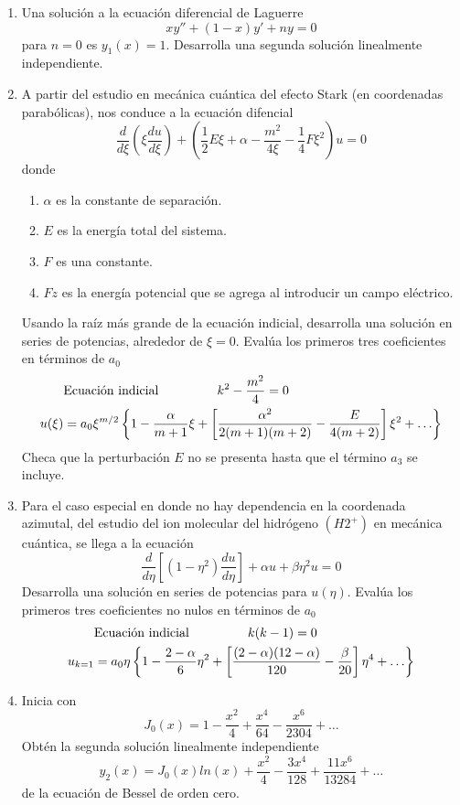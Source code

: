 \begin{enumerate}
\begin{enumerate}[label=(\alph*)]
\end{enumerate}
\item Una solución a la ecuación diferencial de Laguerre
\[ xy'' + (1-x) y' + ny = 0\]
para $n=0$ es $y_{1}(x)=1$. Desarrolla una segunda solución linealmente independiente.
\item A partir del estudio en mecánica cuántica del efecto Stark (en coordenadas parabólicas), nos conduce a la ecuación difencial
\[ \dfrac{d}{d \xi} \left( \xi \dfrac{d u}{d \xi} \right) + \left( \dfrac{1}{2} E \xi + \alpha - \dfrac{m^{2}}{4 \xi} - \dfrac{1}{4} F \xi^{2} \right) u = 0 \]
donde
\begin{enumerate}[label=(\roman*)]
\item $\alpha$ es la constante de separación.
\item $E$ es la energía total del sistema.
\item $F$ es una constante.
\item $Fz$ es la energía potencial que se agrega al introducir un campo eléctrico.
\end{enumerate}
Usando la raíz más grande de la ecuación indicial, desarrolla una solución en series de potencias, alrededor de $\xi=0$. Evalúa los primeros tres coeficientes en términos de $a_{0}$
\[  \begin{split}
& \text{Ecuación indicial } \hspace{1.5cm} k^{2} - \dfrac{m^{2}}{4} = 0 \\
u(\xi) &=  a_{0} \xi^{m/2} \left\lbrace 1 - \dfrac{\alpha}{m+1} \xi + \left[ \dfrac{\alpha^{2}}{2(m+1)(m+2)} - \dfrac{E}{4(m+2)} \right] \xi^{2} + \ldots \right\rbrace
\end{split} \]
Checa que la perturbación $E$ no se presenta hasta que el término $a_{3}$ se incluye.
\item Para el caso especial en donde no hay dependencia en la coordenada azimutal, del estudio del ion molecular del hidrógeno $(H2^{+})$ en mecánica cuántica, se llega a la ecuación
\[ \dfrac{d}{d \eta} \left[ (1 - \eta^{2} ) \dfrac{d u}{d \eta} \right] + \alpha u + \beta \eta^{2} u = 0 \]
Desarrolla una solución en series de potencias para $u(\eta)$. Evalúa los primeros tres coeficientes no nulos en términos de $a_{0}$
\[  \begin{split}
& \text{Ecuación indicial } \hspace{1.5cm} k(k-1) = 0 \\
u_{k=1} &=  a_{0} \eta \left\lbrace 1 - \dfrac{2- \alpha}{6} \eta^{2} + \left[ \dfrac{(2-\alpha)(12-\alpha)}{120} - \dfrac{\beta}{20} \right] \eta^{4} + \ldots \right\rbrace
\end{split} \] 

\item Inicia con 
\[ J_{0} (x) = 1 - \dfrac{x^{2}}{4} +  \dfrac{x^{4}}{64} -  \dfrac{x^{6}}{2304} + \ldots \]
Obtén la segunda solución linealmente independiente
\[ y_{2}(x) = J_{0}(x) ln(x) + \dfrac{x^{2}}{4} -  \dfrac{3 x^{4}}{128} +  \dfrac{11 x^{6}}{13284}+ \ldots \]
de la ecuación de Bessel de orden cero.
\end{enumerate}


